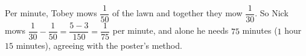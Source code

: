 Per minute, Tobey mows $\dfrac{1}{50}$ of the lawn and together they mow $\dfrac{1}{30}$. So Nick mows $\dfrac{1}{30}-\dfrac{1}{50}=\dfrac{5-3}{150}=\dfrac{1}{75}$ per minute, and alone he needs $\boxed{75}$ minutes ($1$ hour $15$ minutes), agreeing with the poster's method.
